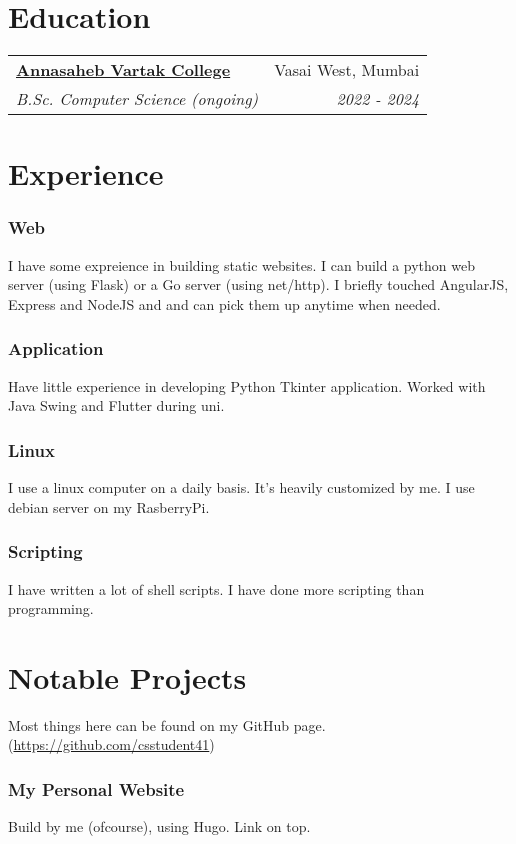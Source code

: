 \documentclass[letterpaper,12pt]{extarticle}
\makeatletter
\newcommand{\organization}[4] {
	\begin{tabular*}{\textwidth}{@{\extracolsep{\fill}}lr}
		\textbf{\large#1} & #2 \\
		\textit{#3} & \textit{#4} \\
	\end{tabular*}\vspace{-10pt}
}
\makeatother
\begin{document}
\section{Education}

\organization
{\href{https://avc.ac.in}{Annasaheb Vartak College}} {Vasai West, Mumbai}
{B.Sc. Computer Science (ongoing)} {2022 - 2024}


\section{Experience}

\subsubsection{Web} I have some expreience in building static websites. I can build a python web server (using Flask) or a Go server (using net/http). I briefly touched AngularJS, Express and NodeJS and and can pick them up anytime when needed.

\subsubsection{Application} Have little experience in developing Python Tkinter application. Worked with Java Swing and Flutter during uni.

\subsubsection{Linux} I use a linux computer on a daily basis. It's heavily customized by me. I use debian server on my RasberryPi.

\subsubsection{Scripting} I have written a lot of shell scripts. I have done more scripting than programming.


\section{Notable Projects}
Most things here can be found on my GitHub page. (\url{https://github.com/csstudent41})

\subsubsection{My Personal Website} Build by me (ofcourse), using Hugo. Link on top.
\end{document}
